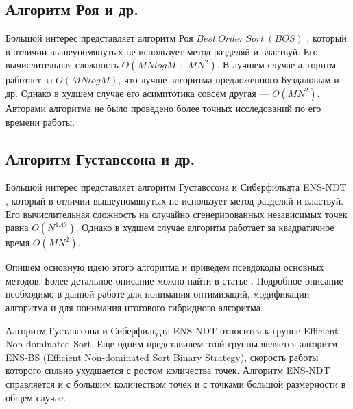 \subsection{Алгоритм Роя и др.}

Большой интерес представляет алгоритм Роя $Best~Order~Sort~(BOS)$ \cite{Roy}, который в отличии вышеупомянутых не
использует метод разделяй и властвуй. Его вычислительная сложность $O(MNlogM+MN^2)$. В лучшем случае алгоритм
работает за $O(MNlogM)$, что лучше алгоритма предложенного Буздаловым и др. Однако в худшем случае его асимптотика
совсем другая {---} $O(MN^2)$. Авторами алгоритма не было проведено более точных исследований по его времени работы.

\subsection{Алгоритм Густавссона и др.}

Большой интерес представляет алгоритм Густавссона и Сиберфильдта ENS-NDT \cite{Gustavsson}, который в отличии вышеупомянутых не использует метод разделяй и властвуй. Его вычислительная сложность на случайно сгенерированных независимых точек равна $O(N^{1.43})$. Однако в худшем случае алгоритм работает за квадратичное время $O(MN^2)$.

Опишем основную идею этого алгоритма и приведем псевдокоды основных методов. Более детальное описание можно найти в статье \cite{Gustavsson}.
Подробное описание необходимо в данной работе для понимания оптимизаций, модификации алгоритма и для понимания итогового гибридного алгоритма.

Алгоритм Густавссона и Сиберфильдта ENS-NDT относится к группе Efficient Non-dominated Sort. Еще одним представилем этой группы является алгоритм ENS-BS (Efficient Non-dominated Sort Binary Strategy), скорость работы которого сильно ухудшается с ростом количества точек. Алгоритм ENS-NDT справляется и с большим количеством точек и с точками большой размерности в общем случае.

